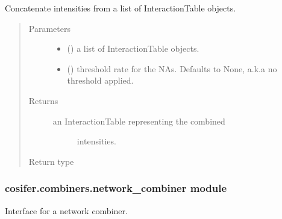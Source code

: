 \documentclass[letterpaper,10pt,english]{sphinxmanual}
\begin{document}

\begin{fulllineitems}
\label{\detokenize{_modules/cosifer.combiners:cosifer.combiners.core.concatenate_intensities}}
Concatenate intensities from a list of InteractionTable objects.
\begin{quote}\begin{description}
\item[{Parameters}] \leavevmode\begin{itemize}
\item {} 
 () \textendash{} a list of InteractionTable objects.

\item {} 
 (\sphinxstyleliteralemphasis{\sphinxupquote{, }}) \textendash{} threshold rate for the NAs.
Defaults to None, a.k.a no threshold applied.

\end{itemize}

\item[{Returns}] \leavevmode
\begin{description}
\item[{an InteractionTable representing the combined}] \leavevmode
intensities.

\end{description}


\item[{Return type}] \leavevmode
{\hyperref[\detokenize{_modules/cosifer.collections:cosifer.collections.interaction_table.InteractionTable}]{}}

\end{description}\end{quote}

\end{fulllineitems}



\subsubsection{cosifer.combiners.network\_combiner module}
\label{\detokenize{_modules/cosifer.combiners:module-cosifer.combiners.network_combiner}}\label{\detokenize{_modules/cosifer.combiners:cosifer-combiners-network-combiner-module}}
Interface for a network combiner.
\end{document}
